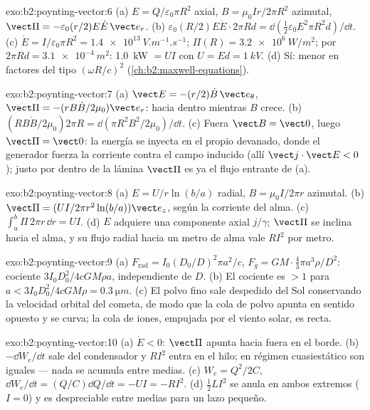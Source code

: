 \begin{solution}{exo:b2:poynting-vector:6}
(a) $E = Q/\varepsilon_0\pi R^2$ axial, $B = \mu_0Ir/2\pi R^2$ azimutal, $\vect\Pi = -\varepsilon_0
(r/2)E\dot E\,\vect e_r$. (b) $\varepsilon_0(R/2)E\dot E\cdot2\pi Rd = \dd(\tfrac12\varepsilon_0E^2\pi R^2d)/
\dd t$. (c) $\dot E = I/\varepsilon_0\pi R^2 = \qty{1.4e13}{V.m^{-1}.s^{-1}}$; $\Pi(R) = \qty{3.2e6}{W/m^2}$;
por $2\pi Rd = \qty{3.1e-4}{m^2}$: \qty{1.0}{kW} $= UI$ con $U = Ed = \qty{1}{kV}$. (d)
Sí: menor en factores del tipo $(\omega R/c)^2$ (\cref{ch:b2:maxwell-equations}).
\end{solution}

\begin{solution}{exo:b2:poynting-vector:7}
(a) $\vect E = -(r/2)\dot B\,\vect e_\theta$, $\vect\Pi = -(rB\dot B/2\mu_0)\vect e_r$: hacia dentro
mientras $B$ crece. (b) $(RB\dot B/2\mu_0)2\pi R = \dd(\pi R^2B^2/2\mu_0)/\dd t$. (c)
Fuera $\vect B = \vect 0$, luego $\vect\Pi = \vect 0$: la energía se inyecta en el
propio devanado, donde el generador fuerza la corriente contra el campo
inducido (allí $\vect j\cdot\vect E < 0$); justo por dentro de la lámina
$\vect\Pi$ es ya el flujo entrante de (a).
\end{solution}

\begin{solution}{exo:b2:poynting-vector:8}
(a) $E = U/r\ln(b/a)$ radial, $B = \mu_0I/2\pi r$ azimutal. (b) $\vect\Pi = (UI/
2\pi r^2\ln(b/a))\vect e_z$, según la corriente del alma. (c) $\int_a^b\Pi\,2\pi r\,\dd r =
UI$. (d) $E$ adquiere una componente axial $j/\gamma$; $\vect\Pi$ se inclina hacia
el alma, y su flujo radial hacia un metro de alma vale $RI^2$ por metro.
\end{solution}

\begin{solution}{exo:b2:poynting-vector:9}
(a) $F_{\text{rad}} = I_0(D_0/D)^2\pi a^2/c$, $F_g = GM\cdot\tfrac43\pi a^3\rho/D^2$: cociente
$3I_0D_0^2/4cGM\rho a$, independiente de $D$. (b) El cociente es $> 1$ para $a < 3I_0D_0^2/
4cGM\rho = \qty{0.3}{\micro m}$. (c) El polvo fino sale despedido del Sol
conservando la velocidad orbital del cometa, de modo que la cola de polvo
apunta en sentido opuesto y se curva; la cola de iones, empujada por el
viento solar, es recta.
\end{solution}

\begin{solution}{exo:b2:poynting-vector:10}
(a) $\dot E < 0$: $\vect\Pi$ apunta hacia fuera en el borde. (b) $-\dd W_e/\dd t$
sale del condensador y $RI^2$ entra en el hilo; en régimen cuasiestático
son iguales --- nada se acumula entre medias. (c) $W_e =
Q^2/2C$, $\dd W_e/\dd t = (Q/C)\dd Q/\dd t = -UI = -RI^2$. (d) $\tfrac12LI^2$
se anula en ambos extremos ($I = 0$) y es despreciable entre medias para un
lazo pequeño.
\end{solution}

